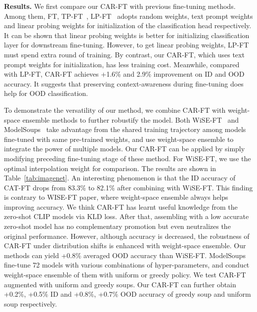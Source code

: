 \documentclass[pdflatex,sn-basic,iicol]{sn-jnl}
\theoremstyle{thmstyleone}\newtheorem{theorem}{Theorem}\newtheorem{proposition}[theorem]{Proposition}
\theoremstyle{thmstyletwo}\newtheorem{example}{Example}\newtheorem{remark}{Remark}
\theoremstyle{thmstylethree}\newtheorem{definition}{Definition}
\begin{document}
\noindent\textbf{Results.} We first compare our CAR-FT with previous fine-tuning methods. Among them, FT, TP-FT~\citep{li2022elevater,wortsman2022robust,wortsman2022model}, LP-FT~\citep{kumar2021fine} adopts random weights, text prompt weights and linear probing weights for initialization of the classification head respectively. It can be shown that linear probing weights is better for initializing classification layer for downstream fine-tuning. However, to get linear probing weights, LP-FT must spend extra round of training. By contrast, our CAR-FT, which uses text prompt weights for initialization, has less training cost. Meanwhile, compared with LP-FT, CAR-FT achieves +1.6\% and 2.9\% improvement on ID and OOD accuracy. It suggests that preserving context-awareness during fine-tuning does help for OOD classification. 

To demonstrate the versatility of our method, we combine CAR-FT with weight-space ensemble methods to further robustify the model. Both WiSE-FT~\citep{wortsman2022robust} and ModelSoups~\citep{wortsman2022model} take advantage from the shared training trajectory among models fine-tuned with same pre-trained weights, and use weight-space ensemble to integrate the power of multiple models. Our CAR-FT can be applied by simply modifying preceding fine-tuning stage of these method. For WiSE-FT, we use the optimal interpolation weight for comparison. The results are shown in Table~\ref{tab:imagenet}. An interesting phenomenon is that the ID accuracy of CAT-FT drops from 83.3\% to 82.1\% after combining with WiSE-FT. This finding is contrary to WISE-FT paper, where weight-space ensemble always helps improving accuracy. We think CAR-FT has learnt useful knowledge from the zero-shot CLIP models via KLD loss. After that, assembling with a low accurate zero-shot model has no complementary promotion but even neutralizes the original performance. However, although accuracy is decreased, the robustness of CAR-FT under distribution shifts is enhanced with weight-space ensemble. Our methods can yield +0.8\% averaged OOD accuracy than WiSE-FT. ModelSoups fine-tune 72 models with various combinations of hyper-parameters, and conduct weight-space ensemble of them with uniform or greedy policy. We test CAR-FT augmented with uniform and greedy soups. Our CAR-FT can further obtain +0.2\%, +0.5\% ID and +0.8\%, +0.7\% OOD accuracy of greedy soup and uniform soup respectively.
\end{document}
